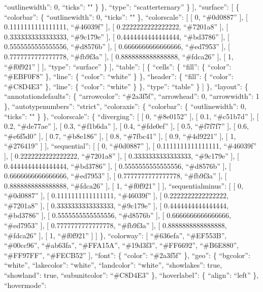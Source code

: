 \documentclass[
]{article}
\begin{document}
``outlinewidth'': 0, ``ticks'': "" \} \}, ``type'': ``scatterternary''
\} {]}, ``surface'': {[} \{ ``colorbar'': \{ ``outlinewidth'': 0,
``ticks'': "" \}, ``colorscale'': {[} {[} 0, ``\#0d0887'' {]}, {[}
0.1111111111111111, ``\#46039f'' {]}, {[} 0.2222222222222222,
``\#7201a8'' {]}, {[} 0.3333333333333333, ``\#9c179e'' {]}, {[}
0.4444444444444444, ``\#bd3786'' {]}, {[} 0.5555555555555556,
``\#d8576b'' {]}, {[} 0.6666666666666666, ``\#ed7953'' {]}, {[}
0.7777777777777778, ``\#fb9f3a'' {]}, {[} 0.8888888888888888,
``\#fdca26'' {]}, {[} 1, ``\#f0f921'' {]} {]}, ``type'': ``surface'' \}
{]}, ``table'': {[} \{ ``cells'': \{ ``fill'': \{ ``color'':
``\#EBF0F8'' \}, ``line'': \{ ``color'': ``white'' \} \}, ``header'': \{
``fill'': \{ ``color'': ``\#C8D4E3'' \}, ``line'': \{ ``color'':
``white'' \} \}, ``type'': ``table'' \} {]} \}, ``layout'': \{
``annotationdefaults'': \{ ``arrowcolor'': ``\#2a3f5f'', ``arrowhead'':
0, ``arrowwidth'': 1 \}, ``autotypenumbers'': ``strict'', ``coloraxis'':
\{ ``colorbar'': \{ ``outlinewidth'': 0, ``ticks'': "" \} \},
``colorscale'': \{ ``diverging'': {[} {[} 0, ``\#8e0152'' {]}, {[} 0.1,
``\#c51b7d'' {]}, {[} 0.2, ``\#de77ae'' {]}, {[} 0.3, ``\#f1b6da'' {]},
{[} 0.4, ``\#fde0ef'' {]}, {[} 0.5, ``\#f7f7f7'' {]}, {[} 0.6,
``\#e6f5d0'' {]}, {[} 0.7, ``\#b8e186'' {]}, {[} 0.8, ``\#7fbc41'' {]},
{[} 0.9, ``\#4d9221'' {]}, {[} 1, ``\#276419'' {]} {]}, ``sequential'':
{[} {[} 0, ``\#0d0887'' {]}, {[} 0.1111111111111111, ``\#46039f'' {]},
{[} 0.2222222222222222, ``\#7201a8'' {]}, {[} 0.3333333333333333,
``\#9c179e'' {]}, {[} 0.4444444444444444, ``\#bd3786'' {]}, {[}
0.5555555555555556, ``\#d8576b'' {]}, {[} 0.6666666666666666,
``\#ed7953'' {]}, {[} 0.7777777777777778, ``\#fb9f3a'' {]}, {[}
0.8888888888888888, ``\#fdca26'' {]}, {[} 1, ``\#f0f921'' {]} {]},
``sequentialminus'': {[} {[} 0, ``\#0d0887'' {]}, {[}
0.1111111111111111, ``\#46039f'' {]}, {[} 0.2222222222222222,
``\#7201a8'' {]}, {[} 0.3333333333333333, ``\#9c179e'' {]}, {[}
0.4444444444444444, ``\#bd3786'' {]}, {[} 0.5555555555555556,
``\#d8576b'' {]}, {[} 0.6666666666666666, ``\#ed7953'' {]}, {[}
0.7777777777777778, ``\#fb9f3a'' {]}, {[} 0.8888888888888888,
``\#fdca26'' {]}, {[} 1, ``\#f0f921'' {]} {]} \}, ``colorway'': {[}
``\#636efa'', ``\#EF553B'', ``\#00cc96'', ``\#ab63fa'', ``\#FFA15A'',
``\#19d3f3'', ``\#FF6692'', ``\#B6E880'', ``\#FF97FF'', ``\#FECB52''
{]}, ``font'': \{ ``color'': ``\#2a3f5f'' \}, ``geo'': \{ ``bgcolor'':
``white'', ``lakecolor'': ``white'', ``landcolor'': ``white'',
``showlakes'': true, ``showland'': true, ``subunitcolor'': ``\#C8D4E3''
\}, ``hoverlabel'': \{ ``align'': ``left'' \}, ``hovermode'':
\end{document}
